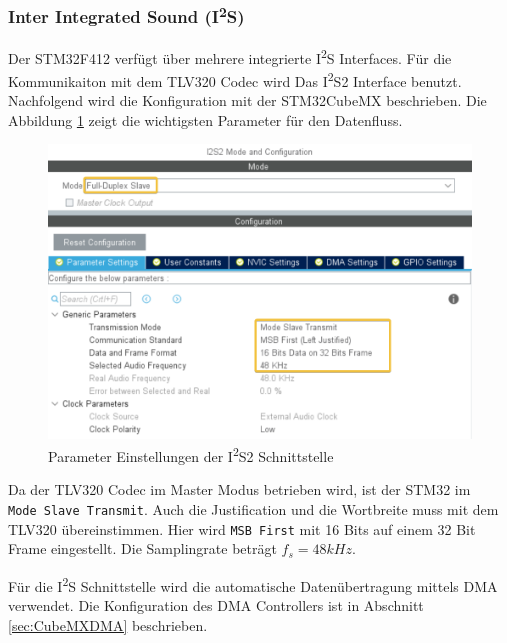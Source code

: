 \subsubsection{Inter Integrated Sound (I\textsuperscript{2}S)}
\label{sec:CubeMXI2S}

Der STM32F412 verfügt über mehrere integrierte I\textsuperscript{2}S Interfaces. 
Für die Kommunikaiton mit dem TLV320 Codec wird Das I\textsuperscript{2}S2 Interface benutzt.
Nachfolgend wird die Konfiguration mit der STM32CubeMX beschrieben.
Die Abbildung \ref{pic:CubeMX_I2S} zeigt die wichtigsten Parameter für den Datenfluss.

\begin{figure}[H]
	\centering
	\includegraphics[width=0.9\linewidth]{../graphics/CubeMX_I2S.png}
	\caption{Parameter Einstellungen der I\textsuperscript{2}S2 Schnittstelle}
	\label{pic:CubeMX_I2S}
\end{figure}

Da der TLV320 Codec im Master Modus betrieben wird, ist der STM32 im \\
\texttt{Mode Slave Transmit}.
Auch die Justification und die Wortbreite muss mit dem TLV320 übereinstimmen. Hier wird \texttt{MSB First} mit 16 Bits auf einem 32 Bit Frame eingestellt.
Die Samplingrate beträgt $f_s = 48\si{kHz}$.

Für die I\textsuperscript{2}S Schnittstelle wird die automatische Datenübertragung mittels DMA verwendet. Die Konfiguration des DMA Controllers ist in Abschnitt \ref{sec:CubeMXDMA} beschrieben.

\newpage
